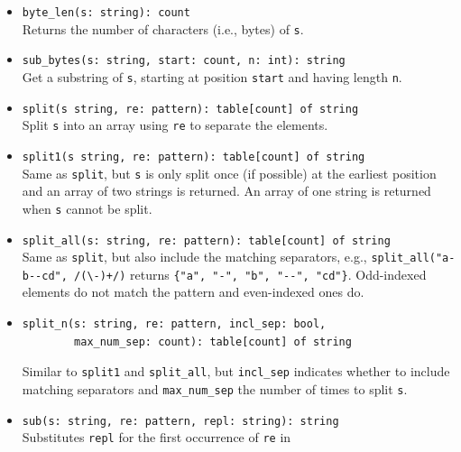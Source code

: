 \documentclass[10pt,landscape]{article}
\begin{document}
\begin{multicols*}{2}
\begin{itemize}
  \item \verb|byte_len(s: string): count|\\
    Returns the number of characters (i.e., bytes) of \texttt{s}.
  \item \verb|sub_bytes(s: string, start: count, n: int): string|\\
    Get a substring of \texttt{s}, starting at position \texttt{start} and
    having length \texttt{n}.
  \item \verb|split(s string, re: pattern): table[count] of string|\\
    Split \texttt{s} into an array using \texttt{re} to separate the elements.
  \item \verb|split1(s string, re: pattern): table[count] of string|\\
    Same as \texttt{split}, but \texttt{s} is only split once (if possible) at
    the earliest position and an array of two strings is returned. An array of
    one string is returned when \texttt{s} cannot be split.
  \item \verb|split_all(s: string, re: pattern): table[count] of string|\\
    Same as \texttt{split}, but also include the matching separators, e.g.,
    \verb|split_all("a-b--cd", /(\-)+/)| returns
    \verb|{"a", "-", "b", "--", "cd"}|. Odd-indexed elements do not match the
    pattern and even-indexed ones do.
  \item
\begin{verbatim}
split_n(s: string, re: pattern, incl_sep: bool,
        max_num_sep: count): table[count] of string
\end{verbatim}
    Similar to \verb|split1| and \verb|split_all|, but \verb|incl_sep|
    indicates whether to include matching separators and \verb|max_num_sep| the
    number of times to split \texttt{s}.
  \item \verb|sub(s: string, re: pattern, repl: string): string|\\
    Substitutes \texttt{repl} for the first occurrence of \texttt{re} in

\end{itemize}
\end{multicols*}
\end{document}
